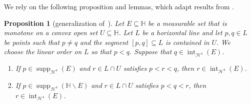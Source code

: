 \documentclass[11pt,reqno]{amsart}
\renewcommand{\H}{\mathbb{H}}
\newcommand{\cH}{\mathcal{H}}
\newcommand{\0}{\mathbf{0}}
\renewcommand{\1}{\mathbf 1}
\renewcommand{\subset}{\subseteq}
\renewcommand{\setminus}{\smallsetminus}
\newtheorem{prop}[thm]{Proposition}
\theoremstyle{remark}
\DeclareMathOperator{\inter}{int}
\DeclareMathOperator{\supp}{supp}
\begin{document}
We rely on the following proposition and lemmas, which adapt results from \cite{CheegerKleinerMetricDiff}.
\begin{prop}[generalization of~{\cite[Proposition~5.8]{CheegerKleinerMetricDiff}}]\label{prop:local monotonicity along lines}
  Let $E\subset \H$ be a measurable set that is monotone on a convex open set $U\subset \H$.  Let $L$ be a horizontal line and let $p, q\in L$ be points such that $p\ne q$ and the segment $[p,q]\subset L$ is contained in $U$.  We choose the linear order on $L$ so that $p<q$.  Suppose that $q\in \inter_{\cH^4}(E)$.
  \begin{enumerate}
  \item \label{it:p in supp E}
    If $p\in \supp_{\cH^4} (E)$ and $r\in L\cap U$ satisfies $p<r<q$, then $r\in \inter_{\cH^4}(E)$.
  \item \label{it:p in supp Ec}
    If $p\in \supp_{\cH^4} (\H\setminus E)$ and $r\in L\cap U$ satisfies $p<q<r$, then $r\in \inter_{\cH^4}(E)$.
  \end{enumerate}
\end{prop}
\end{document}
